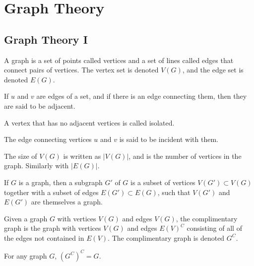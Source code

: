 \chapter{Graph Theory}
    \section{Graph Theory I}
        \begin{definition}
            A graph is a set of points called vertices and a set
            of lines called edges that connect pairs of vertices.
            The vertex set is denoted $V(G)$, and the edge
            set is denoted $E(G)$.
        \end{definition}
        \begin{definition}
            If $u$ and $v$ are edges of a set, and if there
            is an edge connecting them, then they
            are said to be adjacent. 
        \end{definition}
        \begin{definition}
            A vertex that has no adjacent
            vertices is called isolated.
        \end{definition}
        \begin{definition}
            The edge connecting vertices $u$ and
            $v$ is said to be incident with them.
        \end{definition}
        \begin{definition}
            The size of $V(G)$ is written as $|V(G)|$, and
            is the number of vertices in the graph.
            Similarly with $|E(G)|$.
        \end{definition}
        \begin{definition}
            If $G$ is a graph, then a subgraph $G'$ of
            $G$ is a subset of vertices $V(G')\subset{V(G)}$
            together with a subset of edges
            $E(G')\subset{E(G)}$, such that $V(G')$
            and $E(G')$ are themselves a graph.
        \end{definition}
        \begin{definition}
            Given a graph $G$ with vertices $V(G)$ and
            edges $V(G)$, the complimentary graph is the
            graph with vertices $V(G)$ and edges $E(V)^C$
            consisting of all of the edges not contained
            in $E(V)$. The complimentary graph
            is denoted $G^C$.
        \end{definition}
        \begin{theorem}
            For any graph $G$, $(G^C)^{C}=G$.
        \end{theorem}
